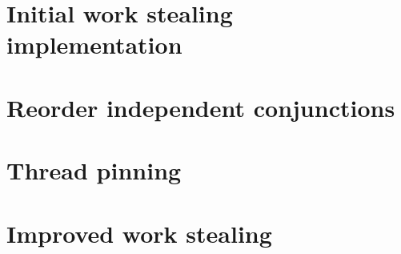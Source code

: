 

\section{Initial work stealing implementation}
\label{sec:rts_work_stealing}



\section{Reorder independent conjunctions}
\label{sec:rts_reorder}



\section{Thread pinning}
\label{sec:rts_thread_pinning}



\section{Improved work stealing}
\label{sec:rts_work_stealing2}



%

